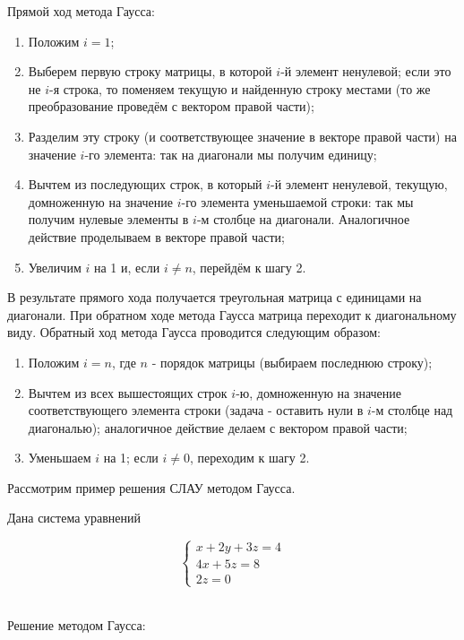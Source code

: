 \documentclass[a4paper,11pt]{report}
\begin{document}
Прямой ход метода Гаусса:
\begin{enumerate}
 \item Положим $i = 1$;
 \item Выберем первую строку матрицы, в которой $i$-й элемент ненулевой; если это не $i$-я строка, то поменяем текущую и найденную
 строку местами (то же преобразование проведём с вектором правой части);
 \item Разделим эту строку (и соответствующее значение в векторе правой части) на значение $i$-го элемента: так на диагонали мы 
 получим единицу;
 \item Вычтем из последующих строк, в который $i$-й элемент ненулевой, текущую, домноженную на значение $i$-го элемента уменьшаемой
 строки: так мы получим нулевые элементы в $i$-м столбце на диагонали. Аналогичное действие проделываем в векторе правой части;
 \item Увеличим $i$ на 1 и, если $i \neq n$, перейдём к шагу 2.
\end{enumerate}

В результате прямого хода получается треугольная матрица с единицами на диагонали. При обратном ходе метода Гаусса матрица переходит к
диагональному виду. Обратный ход метода Гаусса проводится следующим образом:
\begin{enumerate}
 \item Положим $i = n$, где $n$ - порядок матрицы (выбираем последнюю строку);
 \item Вычтем из всех вышестоящих строк $i$-ю, домноженную на значение соответствующего элемента строки (задача - оставить нули в 
 $i$-м столбце над диагональю); аналогичное действие делаем с вектором правой части;
 \item Уменьшаем $i$ на 1; если $i \neq 0$, переходим к шагу 2.
\end{enumerate}


Рассмотрим пример решения СЛАУ методом Гаусса.

Дана система уравнений

\[
\begin{cases}
 x + 2y + 3z = 4 \\
 4x + 5z = 8\\
 2z = 0
\end{cases}
\]

~\\
Решение методом Гаусса:
\end{document}
